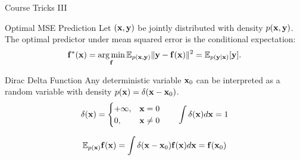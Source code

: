 \documentclass{beamer}
\renewcommand{\eqpause}{}
\renewcommand{\nextonslide}[1]{#1}
\begin{document}
\begin{frame}{Course Tricks III}
	\begin{block}{Optimal MSE Prediction}
		Let $(\mathbf{x}, \mathbf{y})$ be jointly distributed with density $p(\mathbf{x}, \mathbf{y})$. The optimal predictor under mean squared error is the conditional expectation:
		$$
			\bff^*(\bx) = \argmin_{\bff} \bbE_{p(\bx, \by)} \| \by - \bff(\bx) \|^2
			\nextonslide{= \bbE_{p(\by | \bx)} [\by]}.
		$$
		\vspace{-0.4cm}
	\end{block}
	\eqpause
	\begin{block}{Dirac Delta Function}
		Any deterministic variable $\mathbf{x}_0$ can be interpreted as a random variable with density $p(\mathbf{x}) = \delta(\mathbf{x} - \mathbf{x}_0)$. 
		\vspace{-0.3cm}
		$$
			\delta(\mathbf{x}) = 
			\begin{cases}
				+\infty, & \mathbf{x} = 0 \\
				0, & \mathbf{x} \neq 0
			\end{cases} \qquad 
			\int \delta(\mathbf{x}) d\mathbf{x} = 1
		$$
        \eqpause
		$$
			\mathbb{E}_{p(\mathbf{x})}\mathbf{f}(\mathbf{x}) = \int \delta (\mathbf{x} - \mathbf{x}_0) \mathbf{f}(\mathbf{x}) d\mathbf{x} = \mathbf{f}(\mathbf{x}_0)
		$$
	\end{block}
\end{frame}
\end{document}
